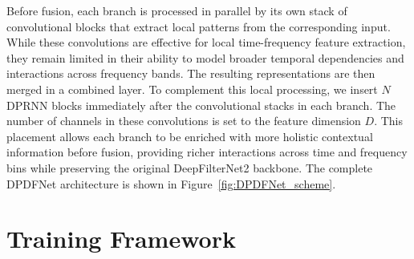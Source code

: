 \documentclass[final,5p,times,authoryear]{elsarticle}
\begin{document}
Before fusion, each branch is processed in parallel by its own stack of convolutional blocks that extract local patterns from the corresponding input. While these convolutions are effective for local time-frequency feature extraction, they remain limited in their ability to model broader temporal dependencies and interactions across frequency bands. The resulting representations are then merged in a combined layer.
%
To complement this local processing, we insert $N$ DPRNN blocks immediately after the convolutional stacks in each branch. The number of channels in these convolutions is set to the feature dimension $D$. This placement allows each branch to be enriched with more holistic contextual information before fusion, providing richer interactions across time and frequency bins while preserving the original DeepFilterNet2 backbone. The complete DPDFNet architecture is shown in Figure~\ref{fig:DPDFNet_scheme}.


\section{Training Framework}
\label{sec:training_framework}
\end{document}
